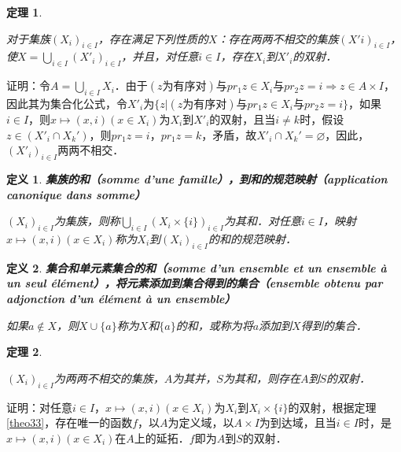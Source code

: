\documentclass[12pt, a4paper, oneside]{book}
\newtheorem{theo}{定理}
\newtheorem{de}{定义}
\begin{document}
			\begin{theo}\label{theo34}
				\hfill\par
				对于集族$(X_i)_{i\in I}$，存在满足下列性质的$X$：存在两两不相交的集族$(X'i)_{i\in I}$，使$X=\bigcup\limits_{i\in I}({X'}_i)_{i\in I}$，并且，对任意$i\in I$，存在$X_i$到${X'}_i$的双射．
			\end{theo}
			证明：令$A=\bigcup\limits_{i\in I}X_i$．由于$(z\text{为有序对})\text{与}pr_1z\in X_i\text{与}pr_2z=i \Rightarrow z\in A\times I$，因此其为集合化公式，令${X'}_i$为$\{z|(z\text{为有序对})\text{与}pr_1z\in X_i\text{与}pr_2z=i\}$，如果$i\in I$，则$x\mapsto (x, i)(x\in X_i)$为$X_i$到${X'}_i$的双射，且当$i\neq k$时，假设$z\in ({X'}_i\cap X_k')$，则$pr_1z=i$，$pr_1z=k$，矛盾，故${X'}_i\cap X_k'=\varnothing$，因此，$({X'}_i)_{i\in I}$两两不相交．

			\begin{de}
				\textbf{集族的和（somme d'une famille），到和的规范映射（application canonique dans somme）}
				\par
				$(X_i)_{i\in I}$为集族，则称$\bigcup\limits_{i\in I}(X_i\times \{i\})_{i\in I}$为其和．对任意$i\in I$，映射$x\mapsto (x, i)(x\in X_i)$称为$X_i$到$(X_i)_{i\in I}$的和的规范映射．
			\end{de}

			\begin{de}
				\textbf{集合和单元素集合的和（somme d'un ensemble et un ensemble à un seul élément），将元素添加到集合得到的集合（ensemble obtenu par adjonction d'un élément à un ensemble）}
				\par
				如果$a\notin X$，则$X\cup\{a\}$称为$X$和$\{a\}$的和，或称为将$a$添加到$X$得到的集合．
			\end{de}
						
			\begin{theo}\label{theo35}
				\hfill\par
				$(X_i)_{i\in I}$为两两不相交的集族，$A$为其并，$S$为其和，则存在$A$到$S$的双射．
			\end{theo}
			证明：对任意$i\in I$，$x\mapsto (x, i)(x\in X_i)$为$X_i$到$X_i\times \{i\}$的双射，根据定理\ref{theo33}，存在唯一的函数$f$，以$A$为定义域，以$A\times I$为到达域，且当$i\in I$时，是$x\mapsto (x, i)(x\in X_i)$在$A$上的延拓．$f$即为$A$到$S$的双射．
			
\end{document}
